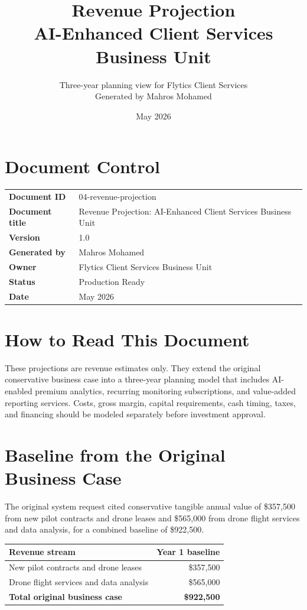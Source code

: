 \documentclass[11pt,a4paper]{article}
\title{\textbf{Revenue Projection\\AI-Enhanced Client Services Business Unit}}
\author{Three-year planning view for Flytics Client Services\\Generated by Mahros Mohamed}
\date{May 2026}
\begin{document}
\maketitle
\section*{Document Control}
\begin{longtable}{>{\bfseries}p{}p{}}
\toprule
Document ID & 04-revenue-projection \\
Document title & Revenue Projection: AI-Enhanced Client Services Business Unit \\
Version & 1.0 \\
Generated by & Mahros Mohamed \\
Owner & Flytics Client Services Business Unit \\
Status & Production Ready \\
Date & May 2026 \\
\bottomrule
\end{longtable}

\renewcommand{\contentsname}{Contents}
\tableofcontents
\newpage

\section*{How to Read This Document}

These projections are revenue estimates only. They extend the original conservative business case into a three-year planning model that includes AI-enabled premium analytics, recurring monitoring subscriptions, and value-added reporting services. Costs, gross margin, capital requirements, cash timing, taxes, and financing should be modeled separately before investment approval.

\section{Baseline from the Original Business Case}

The original system request cited conservative tangible annual value of \$357,500 from new pilot contracts and drone leases and \$565,000 from drone flight services and data analysis, for a combined baseline of \$922,500.

\begin{longtable}{p{}r}
\toprule
\textbf{Revenue stream} & \textbf{Year 1 baseline} \\
\midrule
New pilot contracts and drone leases & \$357,500 \\
Drone flight services and data analysis & \$565,000 \\
\textbf{Total original business case} & \textbf{\$922,500} \\
\bottomrule
\end{longtable}
\end{document}
